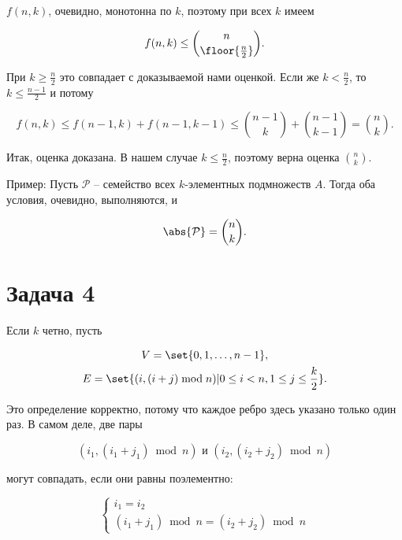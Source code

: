 	$f(n, k)$, очевидно, монотонна по $k$, поэтому при всех $k$ имеем

	\begin{equation*}
		f(n, k) \le \binom{n}{\floor{\frac{n}{2}}}.
	\end{equation*}

	При $k \ge \frac{n}{2}$ это совпадает с доказываемой нами оценкой. Если же $k < \frac{n}{2}$, то $k \le \frac{n-1}{2}$ и потому

	\begin{equation*}
		f(n, k) \le f(n-1, k) + f(n-1, k-1) \le \binom{n-1}{k} + \binom{n-1}{k-1} = \binom{n}{k}.
	\end{equation*}

	Итак, оценка доказана. В нашем случае $k \le \frac{n}{2}$, поэтому верна оценка $\binom{n}{k}$.

	Пример: Пусть $\mathcal{P}$ -- семейство всех $k$-элементных подмножеств $A$. Тогда оба условия, очевидно, выполняются, и

	\begin{equation*}
		\abs{\mathcal{P}} = \binom{n}{k}.
	\end{equation*}


	\section*{Задача 4}

	Если $k$ четно, пусть

	\begin{gather*}
		V = \set{0, 1, \dots, n-1}, \\
		E = \set{(i, (i+j) \bmod n) | 0 \le i < n, 1 \le j \le \frac{k}{2}}.
	\end{gather*}

	Это определение корректно, потому что каждое ребро здесь указано только один раз. В самом деле, две пары

	\begin{equation*}
		(i_1, (i_1+j_1) \bmod n) \text{ и } (i_2, (i_2+j_2) \bmod n)
	\end{equation*}

	могут совпадать, если они равны поэлементно:

	\begin{equation*}
		\begin{cases}
			i_1 = i_2 \\
			(i_1+j_1) \bmod n = (i_2+j_2) \bmod n
		\end{cases}
	\end{equation*}

